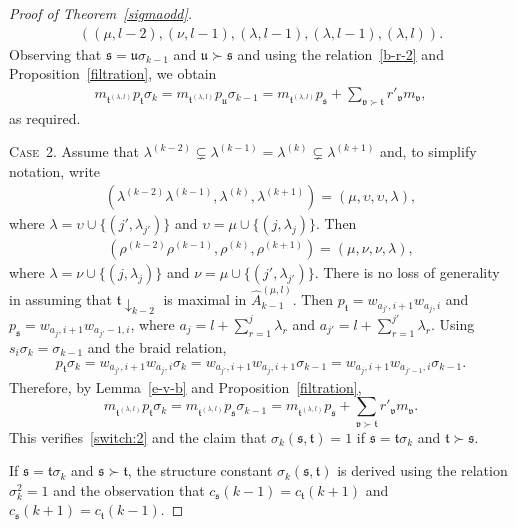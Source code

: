 \documentclass[11pt,a4paper,reqno,svgnames]{amsart}
\theoremstyle{plain}
\theoremstyle{definition}
\numberwithin{equation}{section}
\begin{document}
\begin{proof}[Proof of Theorem~\ref{sigmaodd}]
\begin{align*}
((\mu,l-2),(\nu,l-1),(\lambda,l-1),(\lambda,l-1),(\lambda,l)). 
\end{align*}
Observing that $\mathfrak{s}=\mathfrak{u}\sigma_{k-1}$ and $\mathfrak{u}\succ\mathfrak{s}$ and using the relation~\eqref{b-r-2} and Proposition~\ref{filtration}, we obtain 
\begin{align*}
m_{\mathfrak{t}^{(\lambda,l)}} p_\mathfrak{t}\sigma_{k}=m_{\mathfrak{t}^{(\lambda,l)}} p_\mathfrak{u}\sigma_{k-1}=m_{\mathfrak{t}^{(\lambda,l)}} p_\mathfrak{s}+\sum_{\mathfrak{v}\succ\mathfrak{t}}r'_\mathfrak{v}m_\mathfrak{v},
\end{align*}
as required.

{\textsc{Case~2.}} Assume that $\lambda^{(k-2)}\subsetneq \lambda^{(k-1)}=\lambda^{(k)}\subsetneq \lambda^{(k+1)}$ and, to simplify notation, write
\begin{align*}
(\lambda^{(k-2)} \lambda^{(k-1)},\lambda^{(k)},\lambda^{(k+1)})=(\mu,\upsilon,\upsilon,\lambda), 
\end{align*}
where $\lambda=\upsilon\cup{\lbrace}(j',\lambda_{j'}){\rbrace}$ and $\upsilon=\mu\cup\lbrace(j,\lambda_{j})\rbrace$. Then 
\begin{align*}
(\rho^{(k-2)} \rho^{(k-1)},\rho^{(k)},\rho^{(k+1)})=(\mu,\nu,\nu,\lambda), 
\end{align*}
where $\lambda=\nu\cup\lbrace(j,\lambda_{j}){\rbrace}$ and $\nu=\mu\cup\lbrace(j',\lambda_{j'})\rbrace$. There is no loss of generality in assuming that $\mathfrak{t}\downarrow_{k-2}$ is maximal in $\hat{A}_{k-1}^{(\mu,l)}$. Then $
p_\mathfrak{t}= w_{a_{j'},i+1}w_{a_{j},i}$ and $p_\mathfrak{s}=w_{a_j, i+1}w_{a_{j'}-1,i}$, where  $a_j=l+\sum_{r=1}^{j}\lambda_r$ and $a_{j'}=l+\sum_{r=1}^{j'}\lambda_r$. Using $s_{i}\sigma_{k}=\sigma_{k-1}$ and the braid relation,
\begin{align*}
p_\mathfrak{t}\sigma_k= w_{a_{j'},i+1}w_{a_{j},i}\sigma_k=w_{a_{j'},i+1}w_{a_{j},i+1}\sigma_{k-1} = w_{a_{j},i+1}w_{a_{j'-1},i}\sigma_{k-1}. 
\end{align*}
Therefore, by Lemma~\ref{e-v-b} and Proposition~\ref{filtration},
\[
m_{\mathfrak{t}^{(\lambda,l)}}p_\mathfrak{t}\sigma_{k}=m_{\mathfrak{t}^{(\lambda,l)}}p_\mathfrak{s}\sigma_{k-1}=m_{\mathfrak{t}^{(\lambda,l)}}p_\mathfrak{s}+\sum_{\mathfrak{v}\succ\mathfrak{t}}r'_\mathfrak{v}m_\mathfrak{v}.
\]
This verifies~\eqref{switch:2} and the claim that $\sigma_{k}(\mathfrak{s},\mathfrak{t})=1$ if $\mathfrak{s}=\mathfrak{t}\sigma_{k}$ and $\mathfrak{t}\succ\mathfrak{s}$.  

If $\mathfrak{s}=\mathfrak{t}\sigma_k$ and $\mathfrak{s}\succ\mathfrak{t}$, the structure constant $\sigma_k(\mathfrak{s,t})$ is derived using the relation $\sigma_k^2=1$ and the observation that $c_\mathfrak{s}(k-1)=c_\mathfrak{t}(k+1)$ and $c_\mathfrak{s}(k+1)=c_\mathfrak{t}(k-1)$. 
\end{proof}
\end{document}
